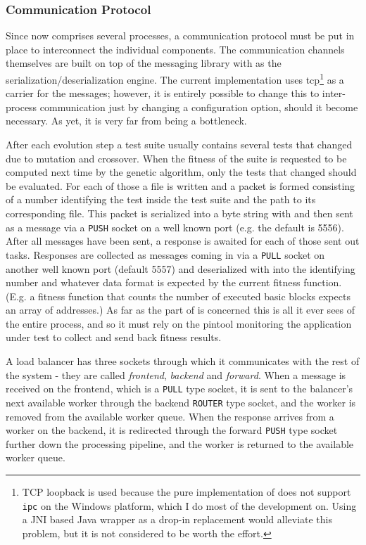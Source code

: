 \subsubsection{Communication Protocol}
\label{sec:proto}
Since \xmlmate now comprises several processes, a communication protocol must be put in place to 
interconnect the individual components. The communication channels themselves are built on top of
the \zmq messaging library with \msgpack as the serialization/deserialization engine. The current
implementation uses tcp\footnote{TCP loopback is used because the pure \java implementation 
of \zmq does not support \texttt{ipc} on the Windows platform, which I do most of the development on.
Using a JNI based Java wrapper as a drop-in replacement would alleviate this problem, 
but it is not considered to be worth the effort.} 
as a carrier for the messages; however, it is entirely possible
to change this to inter-process communication just by changing a configuration option, should it 
become necessary. As yet, it is very far from being a bottleneck.


After each evolution step a test suite usually contains several tests that changed due to mutation and
crossover. When the fitness of the suite is requested to be computed next time by the genetic algorithm, 
only the tests that changed should be evaluated. For each of those a file is written and a packet is 
formed consisting of a number identifying the test inside the test suite and the path to its corresponding 
file. This packet is serialized into a byte string with \msgpack and then sent as a \zmq message via a 
\texttt{PUSH} socket on a well known port (e.g. the default is 5556). After all messages have been sent,
a response is awaited for each of those sent out tasks. Responses are collected as \zmq messages coming 
in via a \texttt{PULL} socket on another well known port (default 5557) and deserialized with \msgpack 
into the identifying number and whatever data format is expected by the current fitness function. 
(E.g. a fitness function that counts the number of executed basic blocks expects an array of addresses.)
As far as the \java part of \xmlmate is concerned this is all it ever sees of the entire process, and so it 
must rely on the pintool monitoring the application under test to collect and send back fitness results.

A load balancer has three \zmq sockets through which it communicates with the rest of the system - they are
called \emph{frontend}, \emph{backend} and \emph{forward}. When a message is received on the frontend,
which is a \texttt{PULL} type socket, it is sent to the balancer's next available worker through
the backend \texttt{ROUTER} type socket, and the worker is removed from the available worker queue. When the
response arrives from a worker on the backend, it is redirected through the forward \texttt{PUSH} type socket
further down the processing pipeline, and the worker is returned to the available worker queue. 


